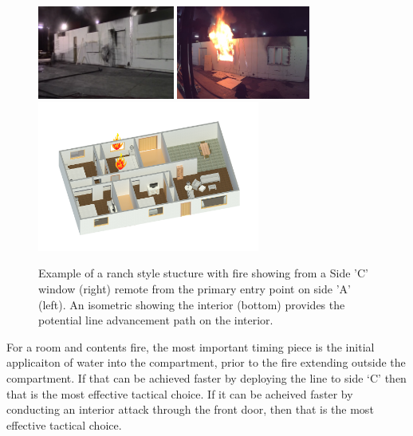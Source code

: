 \documentclass[12pt,oneside]{book}
\begin{document}
\begin{figure}[H]
\centering
\includegraphics[width=0.4\textwidth]{../0_Images/Tactical_Considerations/Fire_Remote_Entry/Side_A}
\includegraphics[width=0.39\textwidth]{../0_Images/Tactical_Considerations/Fire_Remote_Entry/Side_C} 
\includegraphics[width=0.65\textwidth]{../0_Images/Tactical_Considerations/Fire_Remote_Entry/ISO}
\caption[Example - Fire Showing - Remote from Entry Point]{Example of a ranch style stucture with fire showing from a Side 'C' window (right) remote from the primary entry point on side 'A' (left). An isometric showing the interior (bottom) provides the potential line advancement path on the interior.}
\label{fig:TC_Fire_Remote_Entry_Example}
\end{figure}

For a room and contents fire, the most important timing piece is the initial applicaiton of water into the compartment, prior to the fire extending outside the compartment. If that can be achieved faster by deploying the line to side `C' then that is the most effective tactical choice. If it can be acheived faster by conducting an interior attack through the front door, then that is the most effective tactical choice. 
\end{document}
